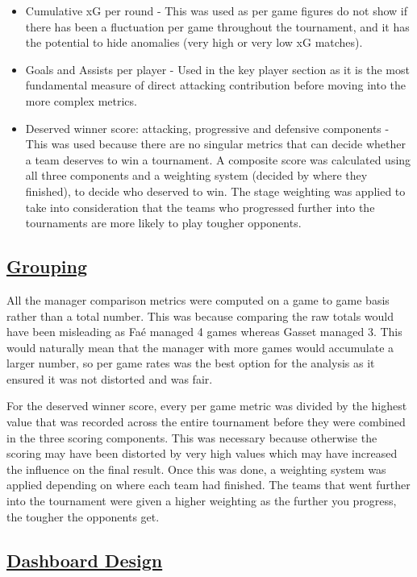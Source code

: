 \documentclass[
  11pt,
  letterpaper,
  DIV=11,
  numbers=noendperiod]{scrartcl}
\begin{document}
\begin{itemize}
\item
  Cumulative xG per round - This was used as per game figures do not
  show if there has been a fluctuation per game throughout the
  tournament, and it has the potential to hide anomalies (very high or
  very low xG matches).
\item
  Goals and Assists per player - Used in the key player section as it is
  the most fundamental measure of direct attacking contribution before
  moving into the more complex metrics.
\item
  Deserved winner score: attacking, progressive and defensive components
  - This was used because there are no singular metrics that can decide
  whether a team deserves to win a tournament. A composite score was
  calculated using all three components and a weighting system (decided
  by where they finished), to decide who deserved to win. The stage
  weighting was applied to take into consideration that the teams who
  progressed further into the tournaments are more likely to play
  tougher opponents.
\end{itemize}

\subsection{\texorpdfstring{\ul{Grouping}}{Grouping}}\label{grouping}

All the manager comparison metrics were computed on a game to game basis
rather than a total number. This was because comparing the raw totals
would have been misleading as Faé managed 4 games whereas Gasset managed
3. This would naturally mean that the manager with more games would
accumulate a larger number, so per game rates was the best option for
the analysis as it ensured it was not distorted and was fair.

For the deserved winner score, every per game metric was divided by the
highest value that was recorded across the entire tournament before they
were combined in the three scoring components. This was necessary
because otherwise the scoring may have been distorted by very high
values which may have increased the influence on the final result. Once
this was done, a weighting system was applied depending on where each
team had finished. The teams that went further into the tournament were
given a higher weighting as the further you progress, the tougher the
opponents get.

\subsection{\texorpdfstring{\ul{Dashboard
Design}}{Dashboard Design}}\label{dashboard-design}
\end{document}
